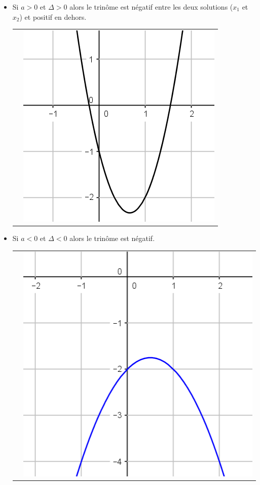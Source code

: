 \documentclass[12pt,a4paper]{article}
\begin{document}
\begin{itemize}
				\item 
				Si $a > 0$ et $\Delta > 0$ alors le trinôme est négatif entre les deux solutions ($x_1$ et $x_2$) et positif en dehors.
				
				\begin{tabular}{ll }
					 &
					
					\includegraphics[scale=0.35]{./img/fig_3}\\
				\end{tabular}
				
				\item 
				Si $a < 0$ et $\Delta < 0$ alors le trinôme est négatif.
				
				\begin{tabular}{ll }
					 &
					
					\includegraphics[scale=0.35]{./img/fig_6}\\
				\end{tabular}
				

\end{itemize}
\end{document}
